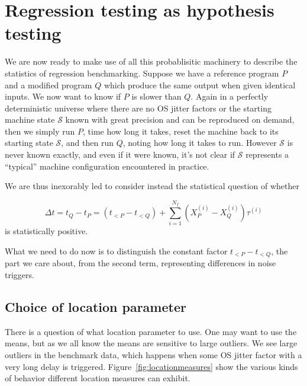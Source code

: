\documentclass[conference]{IEEEtran}
\begin{document}


\section{Regression testing as hypothesis testing}

We are now ready to make use of all this probablisitic machinery to describe the statistics of regression benchmarking. Suppose we have a reference program $P$ and a modified program $Q$ which produce the same output when given identical inputs. We now want to know if $P$ is slower than $Q$. Again in a perfectly deterministic universe where there are no OS jitter factors or the starting machine state $\mathcal S$ known with great precision and can be reproduced on demand, then we simply run $P$, time how long it takes, reset the machine back to its starting state $\mathcal S$, and then run $Q$, noting how long it takes to run. However $\mathcal S$ is never known exactly, and even if it were known, it's not clear if
$\mathcal S$ represents a ``typical'' machine configuration encountered in practice.

We are thus inexorably led to consider instead the statistical question of whether

\begin{equation}
\Delta t = t_Q - t_P
= (t_{<P} - t_{<Q}) + \sum_{i=1}^{N_f} (X^{(i)}_P - X^{(i)}_Q) \tau^{(i)}
\end{equation}
%
is statistically positive.

What we need to do now is to distinguish the constant factor $t_{<P} - t_{<Q}$, the part we care about, from the second term, representing differences in noise triggers.



\subsection{Choice of location parameter}

There is a question of what location parameter to use.
One may want to use the means, but as we all know the means are sensitive to large outliers. We see large outliers in the benchmark data, which happens when some OS jitter factor with a very long delay is triggered.
Figure~\ref{fig:locationmeasures} show the various kinds of behavior different location measures can exhibit.
\end{document}
